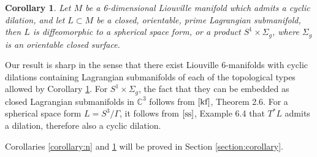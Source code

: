 \documentclass[a4paper]{article}
\newtheorem{corollary}[theorem]{Corollary}
\numberwithin{equation}{section}
\begin{document}
\begin{corollary}\label{corollary:3}
Let $M$ be a 6-dimensional Liouville manifold which admits a cyclic dilation, and let $L\subset M$ be a closed, orientable, prime Lagrangian submanifold, then $L$ is diffeomorphic to a spherical space form, or a product $S^1\times\Sigma_g$, where $\Sigma_g$ is an orientable closed surface.
\end{corollary}

Our result is sharp in the sense that there exist Liouville 6-manifolds with cyclic dilations containing Lagrangian submanifolds of each of the topological types allowed by Corollary \ref{corollary:3}. For $S^1\times\Sigma_g$, the fact that they can be embedded as closed Lagrangian submanifolds in $\mathbb{C}^3$ follows from $\cite{kf}$, Theorem 2.6. For a spherical space form $L=S^3/\Gamma$, it follows from $\cite{ss}$, Example 6.4 that $T^\ast L$ admits a dilation, therefore also a cyclic dilation.

Corollaries \ref{corollary:n} and \ref{corollary:3} will be proved in Section \ref{section:corollary}.
\bigskip
\end{document}
